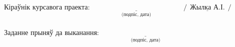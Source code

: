 \documentclass[12pt,a4paper]{extarticle}
\begin{document}
	\vspace{30pt}
	Кіраўнік курсавога праекта: $\underset{\text{(подпіс, дата)}}{\underline{\hspace{150pt}}} \hspace{5pt}  /\underline{\hspace{5pt}\textit{Жылка А.І.}\hspace{5pt}}/$ \\
	\vspace{15pt} \\
	Заданне прыняў да выканання: $\underset{\text{(подпіс, дата)}}{\underline{\hspace{150pt}}}$
\end{document}
